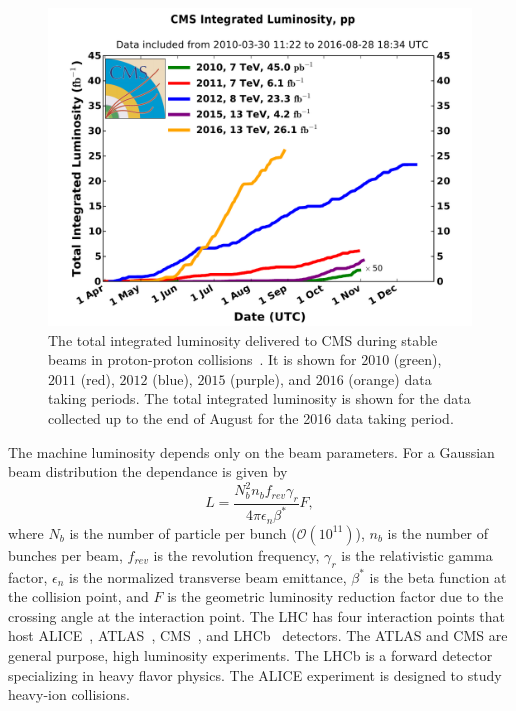 \begin{figure}[h]
\centering
\includegraphics[width=0.8\columnwidth]{figures_chapter2/int_lumi_cumulative_pp_2}
\caption{The total integrated luminosity delivered to CMS during stable beams in proton-proton collisions~\cite{lumi_plot}. It is shown for $2010$ (green), $2011$ (red), $2012$ (blue), $2015$ (purple), and $2016$ (orange) data taking periods. The total integrated luminosity is shown for the data collected up to the end of August for the 2016 data taking period.} 
\label{fig:int}
\end{figure}

The machine luminosity depends only on the beam parameters. For a Gaussian beam distribution the dependance is given by
\begin{equation} \label{eq:lumi_beam}
L = \frac{N_{b}^2n_bf_{rev}\gamma_{r}}{4\pi\epsilon_n\beta^{*}}F,
\end{equation}
where $N_b$ is the number of particle per bunch ($\mathcal{O}(10^{11})$), $n_b$ is the number of bunches per beam, $f_{rev}$ is the revolution frequency, $\gamma_r$ is the relativistic gamma factor, $\epsilon_n$ is the normalized transverse beam emittance, $\beta^{*}$ is the beta function at the collision point, and $F$ is the geometric luminosity reduction factor due to the crossing angle at the interaction point.  The LHC has four interaction points that host ALICE~\cite{Aamodt:2008zz}, ATLAS~\cite{Aad:2008zzm}, CMS~\cite{Chatrchyan:2008aa}, and LHCb~\cite{Alves:2008zz} detectors. The ATLAS and CMS are general purpose, high luminosity experiments. The LHCb is a forward detector specializing in heavy flavor physics. The ALICE experiment is designed to study heavy-ion collisions.   

